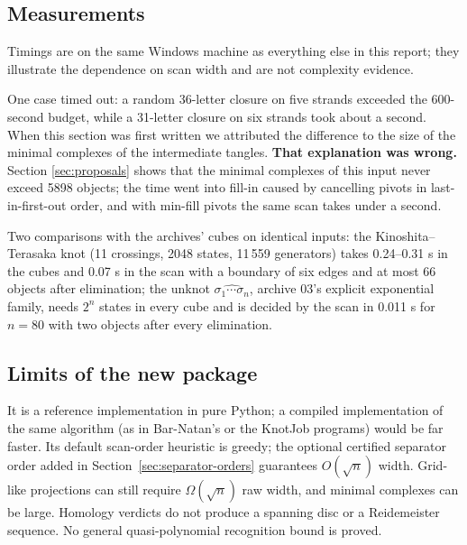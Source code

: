 \documentclass[11pt]{article}
\theoremstyle{remark}
\begin{document}
\subsection{Measurements}
Timings are on the same Windows machine as everything else in this report;
they illustrate the dependence on scan width and are not complexity
evidence.

\begin{center}\small
{}
\end{center}

\begin{center}\small
{}
\end{center}

One case timed out: a random 36-letter closure on five strands exceeded the
600-second budget, while a 31-letter closure on six strands took about a
second. When this section was first written we attributed the difference to
the size of the minimal complexes of the intermediate tangles.
\textbf{That explanation was wrong.} Section \ref{sec:proposals} shows that the
minimal complexes of this input never exceed 5898 objects; the time went into
fill-in caused by cancelling pivots in last-in-first-out order, and with
min-fill pivots the same scan takes under a second.

Two comparisons with the archives' cubes on identical inputs: the
Kinoshita--Terasaka knot (11 crossings, 2048 states, 11\,559 generators) takes
0.24--0.31 s in the cubes and 0.07 s in the scan with a boundary of six edges
and at most 66 objects after elimination; the unknot
$\widehat{\sigma_1\cdots\sigma_n}$, archive 03's explicit exponential family,
needs $2^n$ states in every cube and is decided by the scan in 0.011 s for
$n=80$ with two objects after every elimination.

\subsection{Limits of the new package}
It is a reference implementation in pure Python; a compiled implementation of
the same algorithm (as in Bar-Natan's or the KnotJob programs) would be far
faster. Its default scan-order heuristic is greedy; the optional certified
separator order added in Section~\ref{sec:separator-orders} guarantees
$O(\sqrt n)$ width. Grid-like projections can still require
$\Omega(\sqrt n)$ raw width, and minimal complexes can be large. Homology
verdicts do not produce a spanning disc or a Reidemeister sequence.
No general quasi-polynomial recognition bound is proved.
\end{document}
